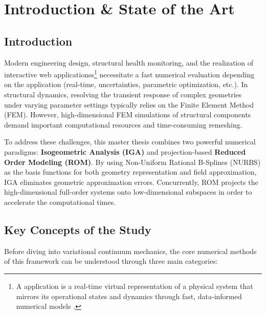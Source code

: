 \chapter{Introduction \& State of the Art}
\label{ch:intro}



\section{Introduction}


Modern engineering design, structural health monitoring, and the realization of interactive web applicationss\footnote{A application is a real-time virtual representation of a physical system that mirrors its operational states and dynamics through fast, data-informed numerical models \cite{chinesta2011, Farhat2014}.} necessitate a fast numerical evaluation depending on the application (real-time, uncertainties, parametric optimization, etc.). In structural dynamics, resolving the transient response of complex geometries under varying parameter settings typically relies on the Finite Element Method (FEM). However, high-dimensional FEM simulations of structural components demand important computational resources and time-consuming remeshing.

To address these challenges, this master thesis combines two powerful numerical paradigms: \textbf{Isogeometric Analysis (IGA)} and projection-based \textbf{Reduced Order Modeling (ROM)}. By using Non-Uniform Rational B-Splines (NURBS) as the basis functions for both geometry representation and field approximation, IGA eliminates geometric approximation errors. Concurrently, ROM projects the high-dimensional full-order systems onto low-dimensional subspaces in order to accelerate the computational times.

\section{Key Concepts of the Study}

Before diving into variational continuum mechanics, the core numerical methods of this framework can be understood through three main categories:

